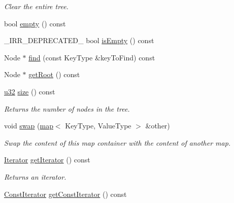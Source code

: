 \begin{DoxyCompactItemize}
\begin{DoxyCompactList}\small\item\em Clear the entire tree. \end{DoxyCompactList}\item 
bool \hyperlink{classirr_1_1core_1_1map_a910309524c697daa29877863b49ed3b9}{empty} () const 
\item 
\+\_\+\+I\+R\+R\+\_\+\+D\+E\+P\+R\+E\+C\+A\+T\+E\+D\+\_\+ bool \hyperlink{classirr_1_1core_1_1map_abe50aefff40a6d71aa9f8b616acaa464}{is\+Empty} () const 
\item 
Node $\ast$ \hyperlink{classirr_1_1core_1_1map_ab8336f5210a2a5fcfd722e5050bd86e0}{find} (const Key\+Type \&key\+To\+Find) const 
\item 
Node $\ast$ \hyperlink{classirr_1_1core_1_1map_ab8823db164a055ec17a68a4ad24f5d4c}{get\+Root} () const 
\item 
\hyperlink{namespaceirr_a0416a53257075833e7002efd0a18e804}{u32} \hyperlink{classirr_1_1core_1_1map_aaf4cb9eaca145cd25030d99121ec4ed6}{size} () const \hypertarget{classirr_1_1core_1_1map_aaf4cb9eaca145cd25030d99121ec4ed6}{}\label{classirr_1_1core_1_1map_aaf4cb9eaca145cd25030d99121ec4ed6}

\begin{DoxyCompactList}\small\item\em Returns the number of nodes in the tree. \end{DoxyCompactList}\item 
void \hyperlink{classirr_1_1core_1_1map_a411cde5df191c16616e20eb7027b9a20}{swap} (\hyperlink{classirr_1_1core_1_1map}{map}$<$ Key\+Type, Value\+Type $>$ \&other)
\begin{DoxyCompactList}\small\item\em Swap the content of this map container with the content of another map. \end{DoxyCompactList}\item 
\hyperlink{classirr_1_1core_1_1map_1_1Iterator}{Iterator} \hyperlink{classirr_1_1core_1_1map_aabacc5723088035c10c28b6642a6a921}{get\+Iterator} () const \hypertarget{classirr_1_1core_1_1map_aabacc5723088035c10c28b6642a6a921}{}\label{classirr_1_1core_1_1map_aabacc5723088035c10c28b6642a6a921}

\begin{DoxyCompactList}\small\item\em Returns an iterator. \end{DoxyCompactList}\item 
\hyperlink{classirr_1_1core_1_1map_1_1ConstIterator}{Const\+Iterator} \hyperlink{classirr_1_1core_1_1map_a997bb3bf46f66a4b42b23ec65e111b65}{get\+Const\+Iterator} () const \hypertarget{classirr_1_1core_1_1map_a997bb3bf46f66a4b42b23ec65e111b65}{}\label{classirr_1_1core_1_1map_a997bb3bf46f66a4b42b23ec65e111b65}


\end{DoxyCompactItemize}

